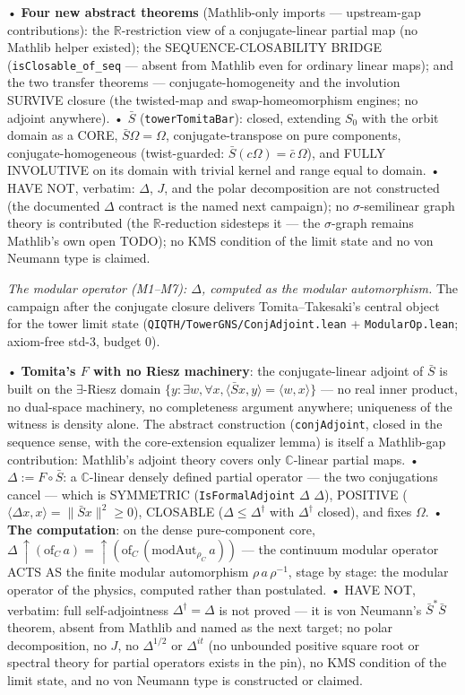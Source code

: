 \documentclass[11pt,a4paper]{article}
\begin{document}
  • \textbf{Four new abstract theorems} (Mathlib-only imports — upstream-gap contributions): the $\mathbb{R}$-restriction view of a conjugate-linear partial map (no Mathlib helper existed); the SEQUENCE-CLOSABILITY BRIDGE (\texttt{isClosable\_of\_seq} — absent from Mathlib even for ordinary linear maps); and the two transfer theorems — conjugate-homogeneity and the involution SURVIVE closure (the twisted-map and swap-homeomorphism engines; no adjoint anywhere).
  • \textbf{$\bar S$} (\texttt{towerTomitaBar}): closed, extending $S_0$ with the orbit domain as a CORE, $\bar S\Omega = \Omega$, conjugate-transpose on pure components, conjugate-homogeneous (twist-guarded: $\bar S(c\Omega) = \bar c\,\Omega$), and FULLY INVOLUTIVE on its domain with trivial kernel and range equal to domain.
  • HAVE NOT, verbatim: $\Delta$, $J$, and the polar decomposition are not constructed (the documented $\Delta$ contract is the named next campaign); no $\sigma$-semilinear graph theory is contributed (the $\mathbb{R}$-reduction sidesteps it — the $\sigma$-graph remains Mathlib's own open TODO); no KMS condition of the limit state and no von Neumann type is claimed.

\emph{The modular operator (M1--M7): $\Delta$, computed as the modular automorphism.} The campaign after the conjugate closure delivers Tomita--Takesaki's central object for the tower limit state (\texttt{QIQTH/TowerGNS/ConjAdjoint.lean} + \texttt{ModularOp.lean}; axiom-free std-3, budget 0).

  • \textbf{Tomita's $F$ with no Riesz machinery}: the conjugate-linear adjoint of $\bar S$ is built on the $\exists$-Riesz domain $\{y : \exists w, \forall x, \langle \bar S x, y\rangle = \langle w, x\rangle\}$ — no real inner product, no dual-space machinery, no completeness argument anywhere; uniqueness of the witness is density alone. The abstract construction (\texttt{conjAdjoint}, closed in the sequence sense, with the core-extension equalizer lemma) is itself a Mathlib-gap contribution: Mathlib's adjoint theory covers only $\mathbb{C}$-linear partial maps.
  • \textbf{$\Delta := F \circ \bar S$}: a $\mathbb{C}$-linear densely defined partial operator — the two conjugations cancel — which is SYMMETRIC (\texttt{IsFormalAdjoint} $\Delta$ $\Delta$), POSITIVE ($\langle \Delta x, x\rangle = \lVert\bar S x\rVert^2 \ge 0$), CLOSABLE ($\Delta \le \Delta^\dagger$ with $\Delta^\dagger$ closed), and fixes $\Omega$.
  • \textbf{The computation}: on the dense pure-component core, $\Delta\,\uparrow\!(\mathrm{of}_C\,a) = \uparrow\!(\mathrm{of}_C\,(\mathrm{modAut}_{\rho_C}\,a))$ — the continuum modular operator ACTS AS the finite modular automorphism $\rho\,a\,\rho^{-1}$, stage by stage: the modular operator of the physics, computed rather than postulated.
  • HAVE NOT, verbatim: full self-adjointness $\Delta^\dagger = \Delta$ is not proved — it is von Neumann's $\bar S^*\bar S$ theorem, absent from Mathlib and named as the next target; no polar decomposition, no $J$, no $\Delta^{1/2}$ or $\Delta^{it}$ (no unbounded positive square root or spectral theory for partial operators exists in the pin), no KMS condition of the limit state, and no von Neumann type is constructed or claimed.
\end{document}
